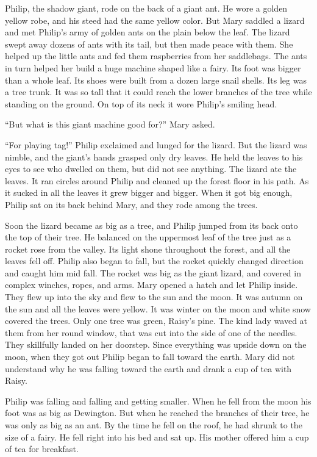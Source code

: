 \documentclass[10pt]{memoir}
\begin{document}
Philip, the shadow giant, rode on the back of a giant ant. He wore a golden
yellow robe, and his steed had the same yellow color. But Mary saddled a lizard
and met Philip's army of golden ants on the plain below the leaf. The lizard
swept away dozens of ants with its tail, but then made peace with them. She
helped up the little ants and fed them raspberries from her saddlebags. The
ants in turn helped her build a huge machine shaped like a fairy. Its foot was
bigger than a whole leaf. Its shoes were built from a dozen large snail shells.
Its leg was a tree trunk. It was so tall that it could reach the lower branches
of the tree while standing on the ground. On top of its neck it wore Philip's
smiling head.

``But what is this giant machine good for?'' Mary asked.

``For playing tag!'' Philip exclaimed and lunged for the lizard. But the lizard
was nimble, and the giant's hands grasped only dry leaves. He held the leaves to
his eyes to see who dwelled on them, but did not see anything. The lizard ate
the leaves. It ran circles around Philip and cleaned up the forest floor in his
path. As it sucked in all the leaves it grew bigger and bigger. When it got big
enough, Philip sat on its back behind Mary, and they rode among the trees.

Soon the lizard became as big as a tree, and Philip jumped from its back onto
the top of their tree. He balanced on the uppermost leaf of the tree just as a
rocket rose from the valley. Its light shone throughout the forest, and all the
leaves fell off. Philip also began to fall, but the rocket quickly changed
direction and caught him mid fall. The rocket was big as the giant lizard, and
covered in complex winches, ropes, and arms. Mary opened a hatch and let
Philip inside. They flew up into the sky and flew to the sun and the moon. It
was autumn on the sun and all the leaves were yellow. It was winter on the moon
and white snow covered the trees. Only one tree was green, Raisy's pine. The
kind lady waved at them from her round window, that was cut into the side of one
of the needles. They skillfully landed on her doorstep. Since everything was
upside down on the moon, when they got out Philip began to fall toward the
earth. Mary did not understand why he was falling toward the earth and drank a
cup of tea with Raisy.

Philip was falling and falling and getting smaller. When he fell from the moon
his foot was as big as Dewington. But when he reached the branches of their
tree, he was only as big as an ant. By the time he fell on the roof, he had
shrunk to the size of a fairy. He fell right into his bed and sat up. His
mother offered him a cup of tea for breakfast.
\end{document}
